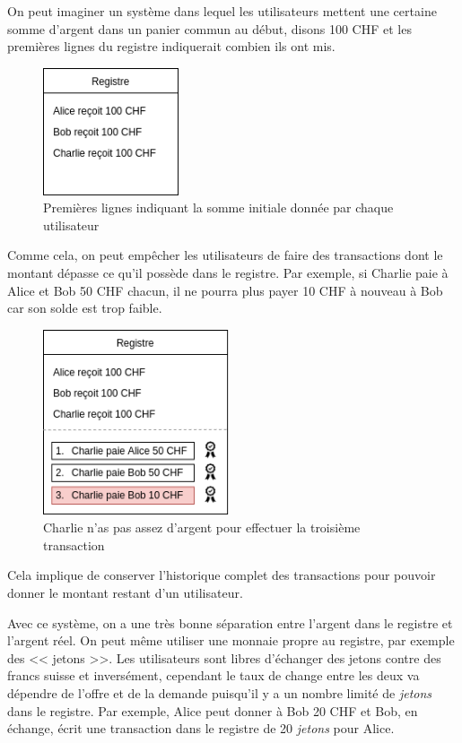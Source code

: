 On peut imaginer un système dans lequel les utilisateurs mettent une certaine somme d'argent dans un panier commun au début, disons 100 CHF et les premières lignes du registre indiquerait combien ils ont mis.

\begin{figure}[H]
  \centering
  \includegraphics[width=4cm]{images/crypto_6.png}
  \caption{Premières lignes indiquant la somme initiale donnée par chaque utilisateur}
\end{figure}

Comme cela, on peut empêcher les utilisateurs de faire des transactions dont le montant dépasse ce qu'il possède dans le registre. Par exemple, si Charlie paie à Alice et Bob 50 CHF chacun, il ne pourra plus payer 10 CHF à nouveau à Bob car son solde est trop faible.

\begin{figure}[H]
  \centering
  \includegraphics[width=5.5cm]{images/crypto_7.png}
  \caption{Charlie n'as pas assez d'argent pour effectuer la troisième transaction}
\end{figure}

Cela implique de conserver l'historique complet des transactions pour pouvoir donner le montant restant d'un utilisateur.

Avec ce système, on a une très bonne séparation entre l'argent dans le registre et l'argent réel. On peut même utiliser une monnaie propre au registre, par exemple des << jetons >>. Les utilisateurs sont libres d'échanger des jetons contre des francs suisse et inversément, cependant le taux de change entre les deux va dépendre de l'offre et de la demande puisqu'il y a un nombre limité de \emph{jetons} dans le registre. Par exemple, Alice peut donner à Bob 20 CHF et Bob, en échange, écrit une transaction dans le registre de 20 \emph{jetons} pour Alice.

